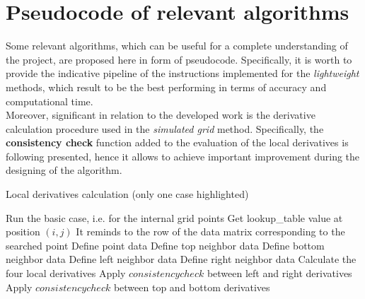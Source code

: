 \chapter{Pseudocode of relevant algorithms}
\label{chapter:pseudocode}

Some relevant algorithms, which can be useful for a complete understanding of the project, are proposed here in form of pseudocode.
Specifically, it is worth to provide the indicative pipeline of the instructions implemented for the \textit{lightweight} methods, which result to be the best performing in terms of accuracy and computational time.\\
Moreover, significant in relation to the developed work is the derivative calculation procedure used in the \textit{simulated grid} method.
Specifically, the \textbf{consistency check} function added to the evaluation of the local derivatives is following presented, hence it allows to achieve important improvement during the designing of the algorithm.

%		
%
\begin{algorithm}
	\label{alg:local-deriv-cal}
	\caption{Local derivatives calculation (only one case highlighted)}
	\begin{algorithmic}[1]
				\State Run the basic case, i.e. for the internal grid points
					\State Get lookup\_table value at position $(i, j)$
					\State It reminds to the row of the data matrix corresponding to the searched point
					\State Define point data
					\State Define top neighbor data
					\State Define bottom neighbor data
					\State Define left neighbor data	
					\State Define right neighbor data
					\State Calculate the four local derivatives
					\State Apply $consistency check$ between left and right derivatives	
					\State Apply $consistency check$ between top and bottom derivatives
				\EndIf
			\EndFor
		\EndFor
	\end{algorithmic} 
\end{algorithm} 

